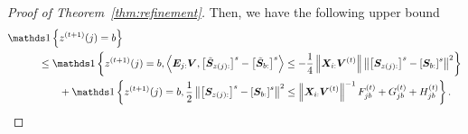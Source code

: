 \documentclass[lettersize,onecolumn,journal]{IEEEtran}
\theoremstyle{definition}
\theoremstyle{definition}
\newcommand{\off}[1]{\left[#1\right]}
\newcommand{\offf}[1]{\left\{#1\right\}}
\newcommand{\ang}[1]{\left\langle#1\right\rangle}
\def\fixme#1#2{\textbf{\color{red}[FIXME (#1): #2]}}
\begin{document}
\begin{proof}[Proof of Theorem~\ref{thm:refinement}]
    Then, we have the following upper bound 
    \begin{align}
         &\ind \offf{ z^{(t+1)}(j) = b  }\\ & \quad \quad \quad \leq \ind \offf{ z^{(t+1)}(j) = b ,   \ang{ \mE_{j:} \mV, \off{  \tilde \mS_{z(j):} }^s - \off{  \tilde \mS_{b:} }^s }  \leq - \frac{1}{4} \onorm{\mX_{i:} \mV^{(t)}} \onorm{ \off{ \mS_{z(j):}  }^s - \off{ \mS_{b:}  }^s  }^2 } \\
         & \quad \quad \quad  \quad \quad + \ind \offf{z^{(t+1)}(j) = b, \frac{1}{2}\onorm{ \off{ \mS_{z(j):}  }^s - \off{ \mS_{b:}  }^s  }^2 \leq \onorm{\mX_{i:} \mV^{(t)}}^{-1} F_{jb}^{(t)} + G_{jb}^{(t)} + H_{jb}^{(t)} }. \label{eq:ind_b}
    \end{align}
    

\end{proof}
\end{document}
